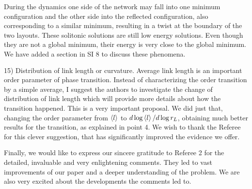 \documentclass[11pt]{article}
\newcommand{\outNim}[1]{}
\begin{document}
\begin{response}
During the dynamics one side of the network may fall into one minimum configuration and the other side into the reflected configuration, also corresponding to a similar minimum, resulting in a twist at the boundary of the two layouts. %
These solitonic solutions are still low energy solutions. 
Even though they are not a global minimum, their energy is very close to the global minimum.
\outNim{
and their number is more plentiful than the global minima because of the combinatorics. 
In fact, most layouts of the 3D lattice, including the ones used for Fig.2 turn out to have such twists, but in the log-scale, $\be{l}$ and curvature seem to be similar among them, suggesting that they belong to approximately degenerate energy states. 
We would be happy to discuss this further. 
}%
We have added a section in SI 8 to discuss these phenomena. 
\end{response}
\begin{response}{
15) Distribution of link length or curvature. Average link length is an important order parameter of phase transition. Instead of characterizing the order transition by a simple average, I suggest the authors to investigate the change of distribution of link length which will provide more details about how the transition happened.
}
This is a very important proposal. 
We did just that, changing the order parameter from $\be{l}$ to $d\log \left<l\right> /d \log r_L$, obtaining much better results for the transition, as explained in point 4.
We wish to thank the Referee for this clever suggestion, that has significantly improved the evidence we offer.

\end{response}


Finally, we would like to express our sincere gratitude to Referee 2 for the detailed, invaluable and very enlightening comments. 
They led to vast improvements of our paper and a deeper understanding of the problem.
We are also very excited about the developments the comments led to. %



\end{document}
